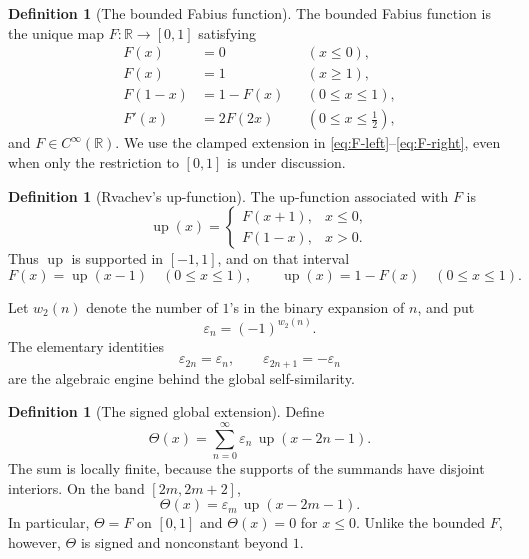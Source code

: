 \documentclass[11pt,oneside]{article}
\theoremstyle{definition}
\newtheorem{definition}[theorem]{Definition}
\theoremstyle{remark}
\newcommand{\upf}{\operatorname{up}}
\newcommand{\wt}{w_2}
\newcommand{\epsTM}{\varepsilon}
\newcommand{\R}{\mathbb R}
\newcommand{\Thetaf}{\Theta}
\begin{document}
\begin{definition}[The bounded Fabius function]\label{def:bounded-F}
The bounded Fabius function is the unique map $F\colon\R\to[0,1]$ satisfying
\begin{align}
  F(x)&=0 &&(x\le 0),\label{eq:F-left}\\
  F(x)&=1 &&(x\ge 1),\label{eq:F-right}\\
  F(1-x)&=1-F(x) &&(0\le x\le1),\label{eq:F-sym}\\
  F'(x)&=2F(2x) &&(0\le x\le\tfrac12),\label{eq:F-diff-local}
\end{align}
and $F\in C^\infty(\R)$.  We use the clamped extension in
\eqref{eq:F-left}--\eqref{eq:F-right}, even when only the restriction to $[0,1]$
is under discussion.
\end{definition}

\begin{definition}[Rvachev's up-function]\label{def:up-from-F}
The up-function associated with $F$ is
\begin{equation}\label{eq:up-from-F}
  \upf(x)=
  \begin{cases}
    F(x+1),&x\le0,\\
    F(1-x),&x>0.
  \end{cases}
\end{equation}
Thus $\upf$ is supported in $[-1,1]$, and on that interval
\begin{equation}\label{eq:F-up-bridge}
  F(x)=\upf(x-1)\quad(0\le x\le1),
  \qquad
  \upf(x)=1-F(x)\quad(0\le x\le1).
\end{equation}
\end{definition}

Let $\wt(n)$ denote the number of $1$'s in the binary expansion of $n$, and put
\begin{equation}\label{eq:TM-sign}
  \epsTM_n=(-1)^{\wt(n)}.
\end{equation}
The elementary identities
\begin{equation}\label{eq:TM-scaling}
  \epsTM_{2n}=\epsTM_n,
  \qquad
  \epsTM_{2n+1}=-\epsTM_n
\end{equation}
are the algebraic engine behind the global self-similarity.

\begin{definition}[The signed global extension]\label{def:global-theta}
Define
\begin{equation}\label{eq:global-theta}
  \Thetaf(x)=\sum_{n=0}^{\infty}\epsTM_n\,
  \upf(x-2n-1).
\end{equation}
The sum is locally finite, because the supports of the summands have disjoint
interiors.  On the band $[2m,2m+2]$,
\begin{equation}\label{eq:theta-band}
  \Thetaf(x)=\epsTM_m\,\upf(x-2m-1).
\end{equation}
In particular, $\Thetaf=F$ on $[0,1]$ and $\Thetaf(x)=0$ for $x\le0$.
Unlike the bounded $F$, however, $\Thetaf$ is signed and nonconstant beyond $1$.
\end{definition}
\end{document}
